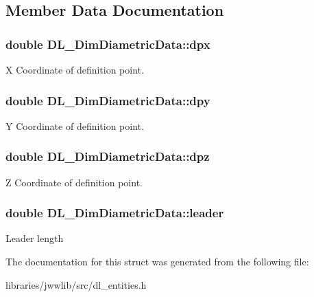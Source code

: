 \subsection{Member Data Documentation}
\hypertarget{structDL__DimDiametricData_a8b351c11f050b026fb6035319f81e3da}{
\subsubsection[{dpx}]{\setlength{\rightskip}{0pt plus 5cm}double D\-L\-\_\-\-Dim\-Diametric\-Data\-::dpx}}\label{structDL__DimDiametricData_a8b351c11f050b026fb6035319f81e3da}
X Coordinate of definition point. \hypertarget{structDL__DimDiametricData_ad782a12029f5b06fd77b53c14b590e5d}{
\subsubsection[{dpy}]{\setlength{\rightskip}{0pt plus 5cm}double D\-L\-\_\-\-Dim\-Diametric\-Data\-::dpy}}\label{structDL__DimDiametricData_ad782a12029f5b06fd77b53c14b590e5d}
Y Coordinate of definition point. \hypertarget{structDL__DimDiametricData_a4704509500b339728e75418742b8de8e}{
\subsubsection[{dpz}]{\setlength{\rightskip}{0pt plus 5cm}double D\-L\-\_\-\-Dim\-Diametric\-Data\-::dpz}}\label{structDL__DimDiametricData_a4704509500b339728e75418742b8de8e}
Z Coordinate of definition point. \hypertarget{structDL__DimDiametricData_a0a345bb7687b44297652820934e3084b}{
\subsubsection[{leader}]{\setlength{\rightskip}{0pt plus 5cm}double D\-L\-\_\-\-Dim\-Diametric\-Data\-::leader}}\label{structDL__DimDiametricData_a0a345bb7687b44297652820934e3084b}
Leader length 

The documentation for this struct was generated from the following file\-:\begin{DoxyCompactItemize}
\item 
libraries/jwwlib/src/dl\-\_\-entities.\-h\end{DoxyCompactItemize}
